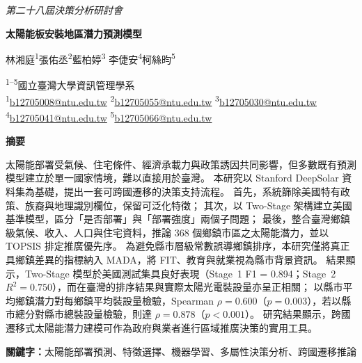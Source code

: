 \documentclass[12pt, a4paper]{article}
\begin{document}
\begin{center}\textit{第二十八屆決策分析研討會}\end{center}

\begin{center}
{\fontsize{14pt}{18pt}\selectfont\bfseries 太陽能板安裝地區潛力預測模型}
\end{center}
\vspace{4pt}

\begin{center}
林湘庭\textsuperscript{1}\quad 張佑丞\textsuperscript{2}\quad 藍柏婷\textsuperscript{3}\quad
李倢安\textsuperscript{4}\quad 柯絲昀\textsuperscript{5}

\vspace{2pt}
\textsuperscript{1--5}國立臺灣大學資訊管理學系\\[2pt]
\textsuperscript{1}\href{mailto:b12705008@ntu.edu.tw}{b12705008@ntu.edu.tw}\quad
\textsuperscript{2}\href{mailto:b12705055@ntu.edu.tw}{b12705055@ntu.edu.tw}\quad
\textsuperscript{3}\href{mailto:b12705030@ntu.edu.tw}{b12705030@ntu.edu.tw}\quad
\textsuperscript{4}\href{mailto:b12705041@ntu.edu.tw}{b12705041@ntu.edu.tw}\quad
\textsuperscript{5}\href{mailto:b12705066@ntu.edu.tw}{b12705066@ntu.edu.tw}
\end{center}
\vspace{8pt}

\noindent\textbf{摘要}

\noindent
太陽能部署受氣候、住宅條件、經濟承載力與政策誘因共同影響，但多數既有預測模型建立於單一國家情境，難以直接用於臺灣。
本研究以 Stanford DeepSolar 資料集為基礎，提出一套可跨國遷移的決策支持流程。
首先，系統篩除美國特有政策、族裔與地理識別欄位，保留可泛化特徵；
其次，以 Two-Stage 架構建立美國基準模型，區分「是否部署」與「部署強度」兩個子問題；
最後，整合臺灣鄉鎮級氣候、收入、人口與住宅資料，推論 368 個鄉鎮市區之太陽能潛力，並以 TOPSIS 排定推廣優先序。
為避免縣市層級常數誤導鄉鎮排序，本研究僅將真正具鄉鎮差異的指標納入 MADA，將 FIT、教育與就業視為縣市背景資訊。
結果顯示，Two-Stage 模型於美國測試集具良好表現（Stage~1 F1 = 0.894；Stage~2 $R^2=0.750$），而在臺灣的排序結果與實際太陽光電裝設量亦呈正相關；
以縣市平均鄉鎮潛力對每鄉鎮平均裝設量檢驗，Spearman $\rho=0.600$（$p=0.003$），若以縣市總分對縣市總裝設量檢驗，則達 $\rho=0.878$（$p<0.001$）。
研究結果顯示，跨國遷移式太陽能潛力建模可作為政府與業者進行區域推廣決策的實用工具。

\vspace{4pt}
\noindent\textbf{關鍵字：}太陽能部署預測、特徵選擇、機器學習、多屬性決策分析、跨國遷移推論
\end{document}
